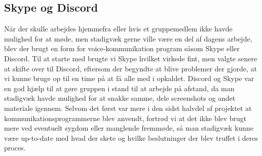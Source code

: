 \subsection{Skype og Discord}\label{SkypeOgDiscord}
Når der skulle arbejdes hjemmefra eller hvis et gruppemedlem ikke havde mulighed for at møde, men stadigvæk gerne ville være en del af dagens arbejde, blev der brugt en form for voice-kommunikation program såsom Skype eller Discord. Til at starte med brugte vi Skype hvilket virkede fint, men valgte senere at skifte over til Discord, eftersom der begyndte at blive problemer der gjorde, at vi kunne bruge op til en time på at få alle med i opkaldet. Discord og Skype var en god hjælp til at gøre gruppen i stand til at arbejde på afstand, da man stadigvæk havde mulighed for at snakke samme, dele screenshots og andet materiale igennem. Selvom det først var mere i den sidst halvdel af projektet at kommunikationsprogrammerne blev anvendt, fortrød vi at det ikke blev brugt mere ved eventuelt sygdom eller manglende fremmøde, så man stadigvæk kunne være up-to-date med hvad der skete og hvilke beslutninger der blev truffet i deres proces.

